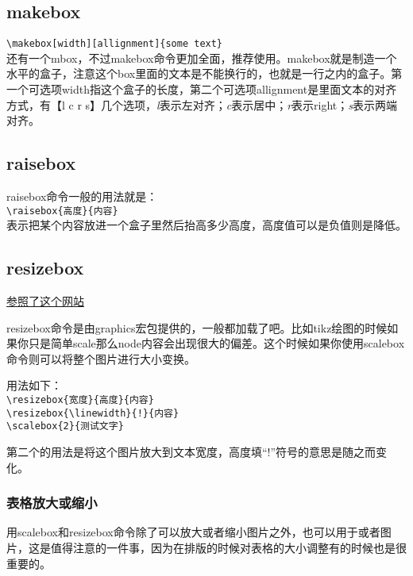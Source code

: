 \documentclass[11pt,oneside]{book}
\begin{document}
        \subsection{makebox}
        \verb+\makebox[width][allignment]{some text}+\\
        还有一个mbox，不过makebox命令更加全面，推荐使用。makebox就是制造一个水平的盒子，注意这个box里面的文本是不能换行的，也就是一行之内的盒子。第一个可选项width指这个盒子的长度，第二个可选项allignment是里面文本的对齐方式，有【l c r s】几个选项，\emph{l}表示左对齐；\emph{c}表示居中；\emph{r}表示right；\emph{s}表示两端对齐。



        \subsection{raisebox}
        raisebox命令一般的用法就是：\\
        \verb+\raisebox{高度}{内容}+\\
        表示把某个内容放进一个盒子里然后抬高多少高度，高度值可以是负值则是降低。

        \subsection{resizebox}
        \href{http://tex.stackexchange.com/questions/13460/scalebox-knowing-how-much-it-scales}{参照了这个网站}

        resizebox命令是由graphics宏包提供的，一般都加载了吧。比如tikz绘图的时候如果你只是简单scale那么node内容会出现很大的偏差。这个时候如果你使用scalebox命令则可以将整个图片进行大小变换。

        用法如下：\\
        \verb+\resizebox{宽度}{高度}{内容} +\\
        \verb+\resizebox{\linewidth}{!}{内容}+\\
        \verb+\scalebox{2}{测试文字}+

        第二个的用法是将这个图片放大到文本宽度，高度填“!”符号的意思是随之而变化。

        \scalebox{2}{测试文字}

        \subsubsection{表格放大或缩小}
        用scalebox和resizebox命令除了可以放大或者缩小图片之外，也可以用于或者图片，这是值得注意的一件事，因为在排版的时候对表格的大小调整有的时候也是很重要的。
\end{document}
